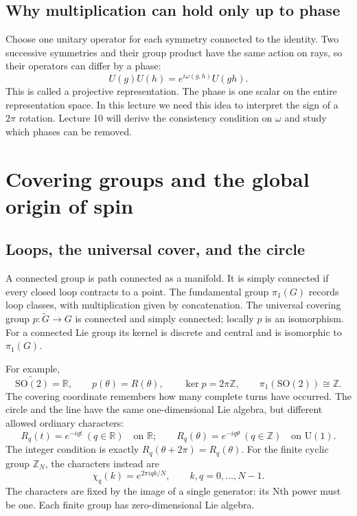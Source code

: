 \documentclass[11pt]{article}
\newcommand{\R}{\mathbb{R}}
\newcommand{\SO}{\mathrm{SO}}
\newcommand{\Z}{\mathbb Z}
\newcommand{\UU}{\mathrm{U}}
\begin{document}
\subsection{Why multiplication can hold only up to phase}
Choose one unitary operator for each symmetry connected to the identity.
Two successive symmetries and their group product have the same action
on rays, so their operators can differ by a phase:
\begin{equation}
 U(g)U(h)=e^{i\omega(g,h)}U(gh).
 \label{eq:projective-preview}
\end{equation}
This is called a projective representation. The phase is one scalar on
the entire representation space. In this lecture we need this idea to
interpret the sign of a \(2\pi\) rotation. Lecture 10 will derive the
consistency condition on \(\omega\) and study which phases can be removed.

\section{Covering groups and the global origin of spin}
\label{sec:covers}
\subsection{Loops, the universal cover, and the circle}
A connected group is path connected as a manifold. It is simply connected
if every closed loop contracts to a point. The fundamental group
\(\pi_1(G)\) records loop classes, with multiplication given by
concatenation. The universal covering group \(p:\widetilde G\to G\)
is connected and simply connected; locally \(p\) is an isomorphism.
For a connected Lie group its kernel is discrete and central and is
isomorphic to \(\pi_1(G)\).

For example,
\begin{equation}
 \widetilde{\SO(2)}=\R,
 \qquad p(\theta)=R(\theta),\qquad
 \ker p=2\pi\Z,\qquad \pi_1(\SO(2))\cong\Z.
 \label{eq:circle-cover}
\end{equation}
The covering coordinate remembers how many complete turns have occurred.
The circle and the line have the same one-dimensional Lie algebra, but
different allowed ordinary characters:
\[
 R_q(t)=e^{-iqt}\ (q\in\R)\quad\text{on }\R;
 \qquad R_q(\theta)=e^{-iq\theta}\ (q\in\Z)\quad\text{on }\UU(1).
\]
The integer condition is exactly \(R_q(\theta+2\pi)=R_q(\theta)\).
For the finite cyclic group \(\Z_N\), the characters instead are
\[
 \chi_q(k)=e^{2\pi i qk/N},\qquad k,q=0,\ldots,N-1.
\]
The characters are fixed by the image of a single generator: its Nth
power must be one. Each finite group has zero-dimensional Lie algebra.
\end{document}
